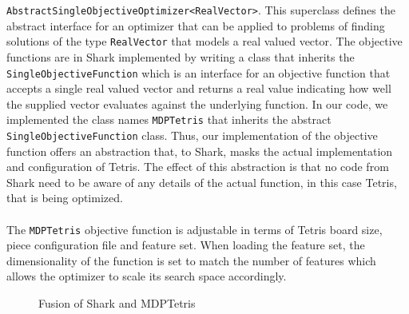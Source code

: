 \lstinline$AbstractSingleObjectiveOptimizer<RealVector>$. This superclass defines the
abstract interface for an optimizer that can be applied to problems of finding 
solutions of the type \lstinline$RealVector$ that models a real valued vector.
The objective functions are in Shark implemented by writing a class that inherits 
the \lstinline$SingleObjectiveFunction$ which is an interface for an objective function 
that accepts a single real valued vector and returns a real value indicating how well the supplied
vector evaluates against the underlying function. In our code, we implemented the class names 
\lstinline$MDPTetris$ that inherits the abstract \lstinline$SingleObjectiveFunction$ class.
Thus, our implementation of the objective function offers an abstraction that, to Shark, masks
the actual implementation and configuration of Tetris. The effect of this abstraction is that 
no code from Shark need to be aware of any details of the actual function, in this case
Tetris, that is being optimized.\\
\\
The \lstinline$MDPTetris$ objective function is adjustable in terms of Tetris board size, piece 
configuration file and feature set. When loading the feature set, the dimensionality of 
the function is set to match the number of features which allows the optimizer to 
scale its search space accordingly.
\begin{figure}[h!]
\begin{center}
\end{center}
\caption{Fusion of Shark and MDPTetris}
\end{figure}


